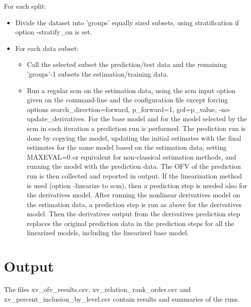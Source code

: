 For each split: 
\begin{itemize}
\item[] Divide the dataset into 'groups' equally sized subsets, using stratification if option -stratify\_on is set.
\item[] For each data subset: 
\begin{itemize}
\item[] Call the selected subset the prediction/test data and the remaining 'groups'-1 subsets the estimation/training data. 
\item[] Run a regular scm on the estimation data, using the scm input option given on the command-line and the 
configuration file except forcing options search\_direction=forward, p\_forward=1,  gof=p\_value, -no-update\_derivatives. 
For the base model and for the model selected by the scm in each iteration a  prediction run is performed. The prediction 
run is  done by copying the model, updating the initial estimates with the final estimates for the same model based on the 
estimation data, setting MAXEVAL=0 or equivalent for non-classical estimation methods, and running the model with the 
prediction data. The OFV of the prediction run is then collected and reported in output.
If the linearization method is used (option -linearize to scm), then a prediction step is needed also for the derivatives model.
 After running the nonlinear derivatives model on the estimation data, a prediction step is run as above for the derivatives model. 
 Then the derivatives output from the derivatives prediction step replaces the original prediction data in the prediction steps for 
 all the linearized models, including the linearized base model.
\end{itemize}
\end{itemize}
\section{Output}
The files xv\_ofv\_results.csv,  xv\_relation\_rank\_order.csv and xv\_percent\_inclusion\_by\_level.csv contain results and 
summaries of the runs.



